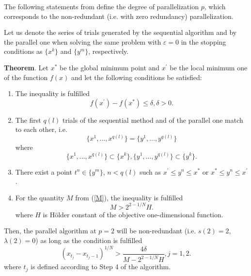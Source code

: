 \documentclass[runningheads]{llncs}
\begin{document}
The following statements from \cite{Strongin2000} define the degree of parallelization $p$, which corresponds to the non-redundant (i.e. with zero redundancy) parallelization.

Let us denote the series of trials generated by the sequential algorithm and by the parallel one when solving the same problem with $\varepsilon=0$ in the stopping conditions as $\{x^k\}$ and $\{y^m\}$, respectively.

\textbf{Theorem}. Let $x^*$ be the global minimum point and $x^{\prime}$ be the local minimum one of the function $f(x)$ and let the following conditions be satisfied:
    \begin{enumerate}
        \item The inequality is fulfilled
            \begin{equation} \label{first_s_ref}
                f(x^{\prime}) - f(x^*) \leq \delta, \delta > 0.
            \end{equation}
        \item The first $q(l)$ trials of the sequential method and of the parallel one match to each other, i.e.
            \begin{equation} \label{second_s_ref}
                \{x^1,...,x^{q(l)}\} = \{y^1,...,y^{q(l)}\}
            \end{equation}
        where
            \begin{equation} \label{third_s_ref}
                \{x^1,...,x^{q(l)}\} \subset \{x^k\}, \{y^1,...,y^{q(l)}\}\subset \{y^k\}.
            \end{equation}
        \item There exist a point $t^n \in \{y^m\}$, $n < q(l)$ such as $x^{\prime} \leq y^n \leq x^*$ or $x^* \leq y^n \leq x^{\prime}$.
        \item For the quantity $M$ from (\ref{M}), the inequality is fulfilled 
            \begin{equation} \label{fourth_s_ref}
                M > 2^{2 - 1/N} H.
            \end{equation}
        where $H$ is H{\"o}lder constant of the objective one-dimensional function.
    \end{enumerate}

Then, the parallel algorithm at $p=2$ will be non-redundant (i.e. $s(2)=2$, $\lambda(2)=0$) as long as the condition is fulfilled 
\begin{equation} \label{p_two_ref}
    (x_{t_j} - x_{t_j - 1})^{1/N} > \frac{4\delta}{M - 2^{2 - 1/N} H}, j=1,2.
\end{equation}
where $t_j$ is defined according to Step 4 of the algorithm.
\end{document}
